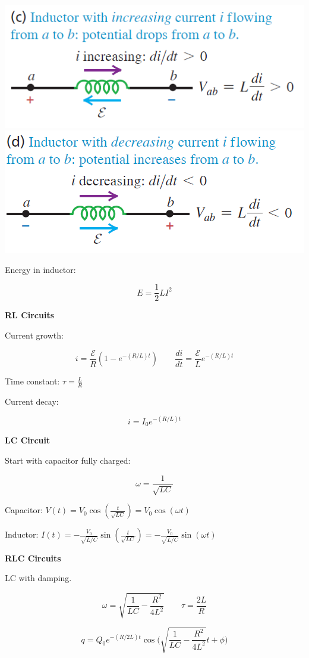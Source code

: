 \documentclass[10pt]{article}
\newcommand{\EP}{\mathcal{E}}
\newcommand\sectionheading[1]{\begin{center}\large{\textbf{#1}}\end{center}\normalsize}
\newcommand\heading[1]{\medskip\textbf{#1}\medskip}
\begin{document}
\begin{multicols*}{3}
\includegraphics[scale=0.3]{images/fs_inductor_1.png}\includegraphics[scale=0.3]{images/fs_inductor_2.png}

Energy in inductor:

\[E=\frac{1}{2}LI^2\]

\heading{RL Circuits}

Current growth:

\[i=\frac{\EP}{R}(1-e^{-(R/L)t}) \qquad \frac{di}{dt}=\frac{\EP}{L}e^{-(R/L)t}\]

Time constant: $\tau=\frac{L}{R}$

Current decay:

\[i=I_0 e^{-(R/L)t}\]

\heading{LC Circuit}

Start with capacitor fully charged:

\[\omega=\frac{1}{\sqrt{LC}}\]

Capacitor: $V(t)=V_0 \cos(\frac{t}{\sqrt{LC}})=V_0\cos(\omega t)$

Inductor: $I(t)=-\frac{V_0}{\sqrt{L/C}}\sin(\frac{t}{\sqrt{LC}})=-\frac{V_0}{\sqrt{L/C}}\sin(\omega t)$

\sectionheading{RLC Circuits}

LC with damping.

\[\omega=\sqrt{\frac{1}{LC}-\frac{R^2}{4L^2}} \qquad \tau=\frac{2L}{R}\]

\[q=Q_0e^{-(R/2L)t}\cos\biggl(\sqrt{\frac{1}{LC}-\frac{R^2}{4L^2}}t+\phi\biggr)\]


\end{multicols*}
\end{document}
